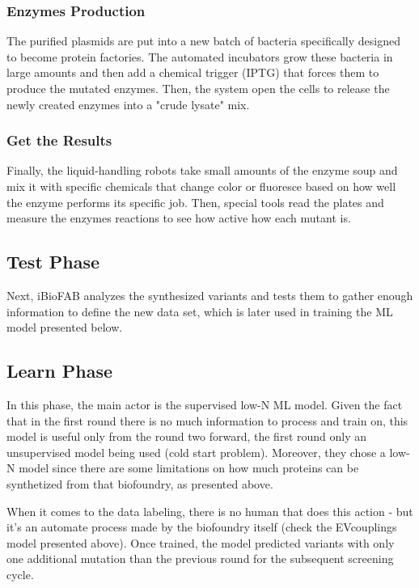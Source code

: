 \documentclass[10pt,a4paper]{article}
\begin{document}
	\subsubsection{Enzymes Production}
	The purified plasmids are put into a new batch of bacteria specifically designed to become protein factories. The automated incubators grow these bacteria in large amounts and then add a chemical trigger (IPTG) that forces them to produce the mutated enzymes. Then, the system open the cells to release the newly created enzymes into a "crude lysate" mix.
	
	\subsubsection{Get the Results}
	
	Finally, the liquid-handling robots take small amounts of the enzyme soup and mix it with specific chemicals that change color or fluoresce based on how well the enzyme performs its specific job. Then, special tools read the plates and measure the enzymes reactions to see how active how each mutant is.
	
	\subsection{Test Phase}
	
	Next, iBioFAB analyzes the synthesized variants and tests them to gather enough information to define the new data set, which is later used in training the ML model presented below.
	
	\subsection{Learn Phase}
	
	In this phase, the main actor is the supervised low-N ML model. Given the fact that in the first round there is no much information to process and train on, this model is useful only from the round two forward, the first round only an unsupervised model being used (cold start problem). Moreover, they chose a low-N model since there are some limitations on how much proteins can be synthetized from that biofoundry, as presented above.
	
	When it comes to the data labeling, there is no human that does this action - but it's an automate process made by the biofoundry itself (check the EVcouplings model presented above). Once trained, the model predicted variants with only one additional mutation than the previous round for the subsequent screening cycle.
	
\end{document}
